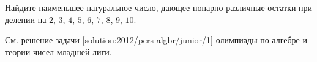 Найдите наименьшее натуральное число, дающее попарно различные остатки при
делении на $2$, $3$, $4$, $5$, $6$, $7$, $8$, $9$, $10$.

\solution
См. решение задачи \ref{solution:2012/pers-algbr/junior/1} олимпиады по алгебре
и теории чисел младшей лиги.

